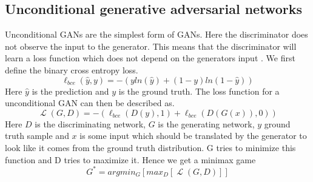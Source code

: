 \documentclass{kththesis}
\DeclareMathOperator{\Lagr}{\mathcal{L}}
\begin{document}
\subsection{Unconditional generative adversarial networks}
Unconditional GANs are the simplest form of GANs. Here the discriminator does not observe the input to the generator. This means that the discriminator will learn a loss function which does not depend on the generators input \parencite{isola_image--image_2016}. We first define the binary cross entropy loss.
\begin{equation}\label{eq:bce}
\ell_{bce}(\hat{y}, y)=-(yln(\hat{y})+(1-y)ln(1-\hat{y}))
\end{equation}
Here $\hat{y}$ is the prediction and $y$ is the ground truth.
The loss function for a unconditional GAN can then be described as.
 \begin{equation}
\Lagr(G, D) = -(\ell_{bce}(D(y), 1) + \ell_{bce}(D(G(x)), 0))
\end{equation}
Here $D$ is the discriminating network, $G$ is the generating network, $y$ ground truth sample and $x$ is some input which should be translated by the generator to look like it comes from the ground truth distribution. G tries to minimize this function and D tries to maximize it. Hence we get a minimax game 
\begin{equation}
G^{*}=argmin_{G}[max_{D}[\Lagr(G, D)]]\label{eq:minimax}
\end{equation}
\end{document}
